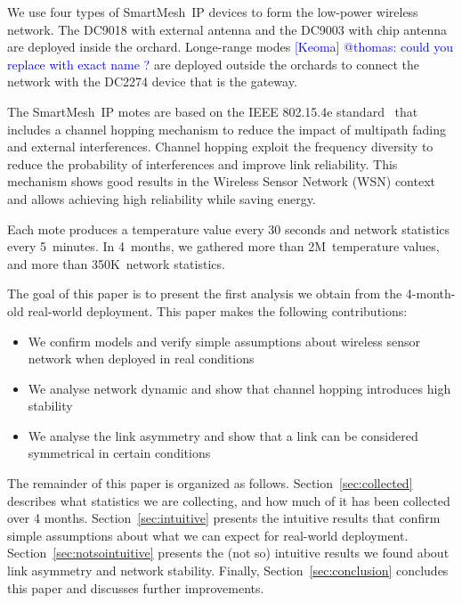 \documentclass{sig-alternate}
\newcommand{\keoma}[1]       {\textcolor{blue}{[Keoma] #1}}
\newcommand{\smip}           {SmartMesh~IP\xspace}
\begin{document}

We use four types of \smip devices to form the low-power wireless network.
The DC9018 with external antenna and the DC9003 with chip antenna are deployed inside the orchard.
Longe-range modes \keoma{@thomas: could you replace with exact name ?} are deployed outside the orchards to connect the network with the DC2274 device that is the gateway.


The \smip motes are based on the IEEE 802.15.4e standard~\cite{std_ieee802154e_2012} that includes a channel hopping mechanism to reduce the impact of multipath fading and external interferences.
Channel hopping exploit the frequency diversity to reduce the probability of interferences and improve link reliability.
This mechanism shows good results in the Wireless Sensor Network (WSN) context~\cite{watteyne10mitigating, watteyne09reliability} and allows achieving high reliability while saving energy.


Each mote produces a temperature value every 30 seconds and network statistics every 5~minutes.
In 4~months, we gathered more than 2M~temperature values, and more than 350K~network statistics.


The goal of this paper is to present the first analysis we obtain from the 4-month-old real-world deployment.
This paper makes the following contributions:
\begin{itemize}
    \item We confirm models and verify simple assumptions about wireless sensor network when deployed in real conditions
    \item We analyse network dynamic and show that channel hopping introduces high stability
    \item We analyse the link asymmetry and show that a link can be considered symmetrical in certain conditions
\end{itemize}


The remainder of this paper is organized as follows.
Section~\ref{sec:collected} describes what statistics we are collecting, and how much of it has been collected over 4 months.
Section~\ref{sec:intuitive} presents the intuitive results that confirm simple assumptions about what we can expect for real-world deployment.
Section~\ref{sec:notsointuitive} presents the (not so) intuitive results we found about link asymmetry and network stability.
Finally, Section~\ref{sec:conclusion} concludes this paper and discusses further improvements.
\end{document}
